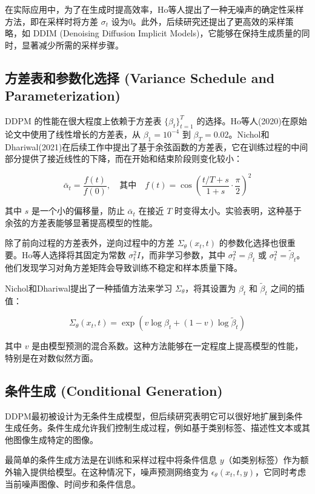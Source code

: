 \documentclass{ctexart}
\begin{document}
在实际应用中，为了在生成时提高效率，Ho等人提出了一种无噪声的确定性采样方法，即在采样时将方差 $\sigma_t$ 设为0。此外，后续研究还提出了更高效的采样策略，如 DDIM (Denoising Diffusion Implicit Models)，它能够在保持生成质量的同时，显著减少所需的采样步骤。

\subsection{方差表和参数化选择 (Variance Schedule and Parameterization)}

DDPM 的性能在很大程度上依赖于方差表 $\{\beta_t\}_{t=1}^T$ 的选择。Ho等人(2020)在原始论文中使用了线性增长的方差表，从 $\beta_1 = 10^{-4}$ 到 $\beta_T = 0.02$。Nichol和Dhariwal(2021)在后续工作中提出了基于余弦函数的方差表，它在训练过程的中间部分提供了接近线性的下降，而在开始和结束阶段则变化较小：

$$ \bar{\alpha}_t = \frac{f(t)}{f(0)}, \quad \text{其中} \quad f(t) = \cos\left(\frac{t/T + s}{1 + s} \cdot \frac{\pi}{2}\right)^2 $$

其中 $s$ 是一个小的偏移量，防止 $\bar{\alpha}_t$ 在接近 $T$ 时变得太小。实验表明，这种基于余弦的方差表能够显著提高模型的性能。

除了前向过程的方差表外，逆向过程中的方差 $\Sigma_\theta(x_t, t)$ 的参数化选择也很重要。Ho等人选择将其固定为常数 $\sigma_t^2 I$，而非学习参数，其中 $\sigma_t^2 = \beta_t$ 或 $\sigma_t^2 = \tilde{\beta}_t$。他们发现学习对角方差矩阵会导致训练不稳定和样本质量下降。

Nichol和Dhariwal提出了一种插值方法来学习 $\Sigma_\theta$，将其设置为 $\beta_t$ 和 $\tilde{\beta}_t$ 之间的插值：

$$ \Sigma_\theta(x_t, t) = \exp(v \log \beta_t + (1 - v) \log \tilde{\beta}_t) $$

其中 $v$ 是由模型预测的混合系数。这种方法能够在一定程度上提高模型的性能，特别是在对数似然方面。

\subsection{条件生成 (Conditional Generation)}

DDPM最初被设计为无条件生成模型，但后续研究表明它可以很好地扩展到条件生成任务。条件生成允许我们控制生成过程，例如基于类别标签、描述性文本或其他图像生成特定的图像。

最简单的条件生成方法是在训练和采样过程中将条件信息 $y$（如类别标签）作为额外输入提供给模型。在这种情况下，噪声预测网络变为 $\epsilon_\theta(x_t, t, y)$，它同时考虑当前噪声图像、时间步和条件信息。
\end{document}
